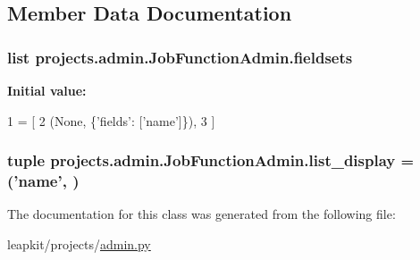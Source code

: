 \subsection{Member Data Documentation}
\hypertarget{classprojects_1_1admin_1_1_job_function_admin_a279e262100369211b3f4de269e572396}{
\subsubsection[{fieldsets}]{\setlength{\rightskip}{0pt plus 5cm}list projects.\-admin.\-Job\-Function\-Admin.\-fieldsets\hspace{0.3cm}{\ttfamily [static]}}}\label{classprojects_1_1admin_1_1_job_function_admin_a279e262100369211b3f4de269e572396}
{\bfseries Initial value\-:}
\begin{DoxyCode}
1 = [
2         (\textcolor{keywordtype}{None}, \{\textcolor{stringliteral}{'fields'}: [\textcolor{stringliteral}{'name'}]\}),
3     ]
\end{DoxyCode}
\hypertarget{classprojects_1_1admin_1_1_job_function_admin_a2177eff6bb8402018392a33ce3d8f1fd}{
\subsubsection[{list\-\_\-display}]{\setlength{\rightskip}{0pt plus 5cm}tuple projects.\-admin.\-Job\-Function\-Admin.\-list\-\_\-display = ('name', )\hspace{0.3cm}{\ttfamily [static]}}}\label{classprojects_1_1admin_1_1_job_function_admin_a2177eff6bb8402018392a33ce3d8f1fd}


The documentation for this class was generated from the following file\-:\begin{DoxyCompactItemize}
\item 
leapkit/projects/\hyperlink{projects_2admin_8py}{admin.\-py}\end{DoxyCompactItemize}
